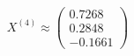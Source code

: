 \documentclass[preview]{standalone}
\begin{document}
\begin{align*}
X^{(4)} \approx \begin{pmatrix} 0.7268 \\ 0.2848 \\ -0.1661 \end{pmatrix}
\end{align*}
\end{document}
